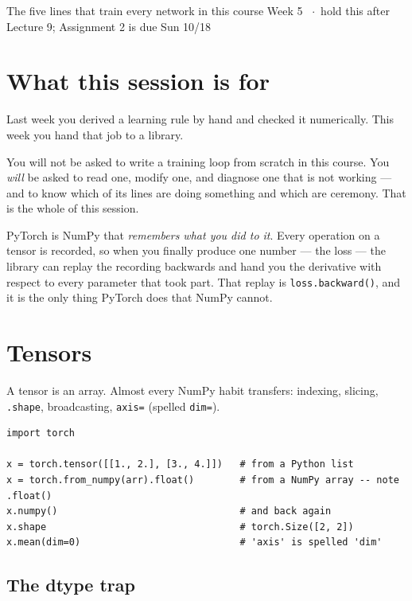 \documentclass[11pt]{article}
\begin{document}
  {The five lines that train every network in this course}
  {Week 5 \ $\cdot$\ hold this after Lecture 9; Assignment 2 is due Sun 10/18}

\section*{What this session is for}

Last week you derived a learning rule by hand and checked it numerically. This
week you hand that job to a library.

You will not be asked to write a training loop from scratch in this course. You
\emph{will} be asked to read one, modify one, and diagnose one that is not
working --- and to know which of its lines are doing something and which are
ceremony. That is the whole of this session.

\begin{keybox}
 PyTorch is NumPy that \emph{remembers what you did to it}. Every
operation on a tensor is recorded, so when you finally produce one number --- the
loss --- the library can replay the recording backwards and hand you the
derivative with respect to every parameter that took part. That replay is
\texttt{loss.backward()}, and it is the only thing PyTorch does that NumPy
cannot.
\end{keybox}

\section{Tensors}

A tensor is an array. Almost every NumPy habit transfers: indexing, slicing,
\texttt{.shape}, broadcasting, \texttt{axis=} (spelled \texttt{dim=}).

\begin{lstlisting}
import torch

x = torch.tensor([[1., 2.], [3., 4.]])   # from a Python list
x = torch.from_numpy(arr).float()        # from a NumPy array -- note .float()
x.numpy()                                # and back again
x.shape                                  # torch.Size([2, 2])
x.mean(dim=0)                            # 'axis' is spelled 'dim'
\end{lstlisting}

\subsection{The dtype trap}
\end{document}

